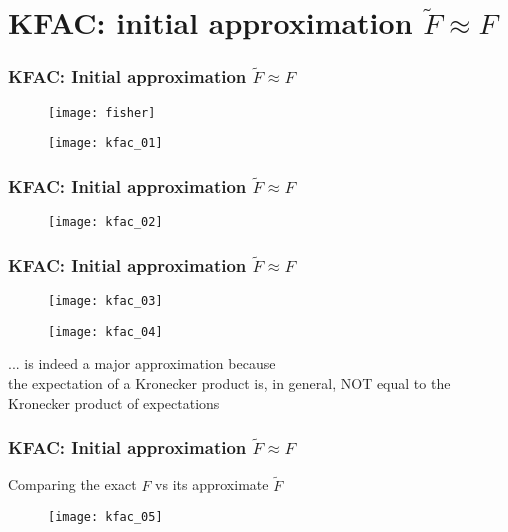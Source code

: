 \section{KFAC: initial approximation $\tilde{F} \approx F$}

\begin{frame}
\frametitle{KFAC: Initial approximation $\tilde{F} \approx F$}

\begin{figure}
    \raggedright
    \texttt{[image: fisher]}
\end{figure}

\begin{figure}
    \raggedright
    \texttt{[image: kfac\_01]}
\end{figure}

\end{frame}

\begin{frame}
\frametitle{KFAC: Initial approximation $\tilde{F} \approx F$}

\begin{figure}
    \centering
    \texttt{[image: kfac\_02]}
\end{figure}

\end{frame}

\begin{frame}
\frametitle{KFAC: Initial approximation $\tilde{F} \approx F$}

\begin{figure}
    \raggedright
    \texttt{[image: kfac\_03]}
\end{figure}

\begin{figure}
    \raggedright
    \texttt{[image: kfac\_04]}
\end{figure}

... is indeed a major approximation because\\
the expectation of a Kronecker product is, in general, NOT
equal to the Kronecker product of expectations

\end{frame}

\begin{frame}
\frametitle{KFAC: Initial approximation $\tilde{F} \approx F$}
Comparing the exact $F$ vs its approximate $\tilde{F}$
\begin{figure}
    \centering
    \texttt{[image: kfac\_05]}
\end{figure}

\end{frame}

